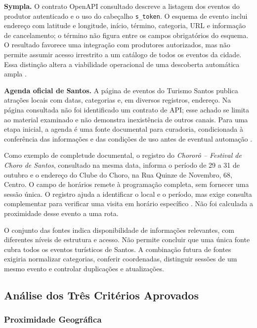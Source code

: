 \textbf{Sympla.} O contrato OpenAPI consultado descreve a listagem dos eventos do produtor autenticado e o uso do cabeçalho \texttt{s\_token}. O esquema de evento inclui endereço com latitude e longitude, início, término, categoria, URL e informação de cancelamento; o término não figura entre os campos obrigatórios do esquema. O resultado favorece uma integração com produtores autorizados, mas não permite assumir acesso irrestrito a um catálogo de todos os eventos da cidade. Essa distinção altera a viabilidade operacional de uma descoberta automática ampla \parencite{sympla2026}.

\textbf{Agenda oficial de Santos.} A página de eventos do Turismo Santos publica atrações locais com datas, categorias e, em diversos registros, endereço. Na página consultada não foi identificado um contrato de API; esse achado se limita ao material examinado e não demonstra inexistência de outros canais. Para uma etapa inicial, a agenda é uma fonte documental para curadoria, condicionada à conferência das informações e das condições de uso antes de eventual automação \parencite{santos2026agenda}.

Como exemplo de completude documental, o registro do \textit{Chororô -- Festival de Choro de Santos}, consultado na mesma data, informa o período de 29 a 31 de outubro e o endereço do Clube do Choro, na Rua Quinze de Novembro, 68, Centro. O campo de horários remete à programação completa, sem fornecer uma sessão única. O registro ajuda a identificar o local e o período, mas exige consulta complementar para verificar uma visita em horário específico \parencite{santos2026chororo}. Não foi calculada a proximidade desse evento a uma rota.

O conjunto das fontes indica disponibilidade de informações relevantes, com diferentes níveis de estrutura e acesso. Não permite concluir que uma única fonte cubra todos os eventos turísticos de Santos. A combinação futura de fontes exigiria normalizar categorias, conferir coordenadas, distinguir sessões de um mesmo evento e controlar duplicações e atualizações.

\subsection{Análise dos Três Critérios Aprovados}

\subsubsection{Proximidade Geográfica}

